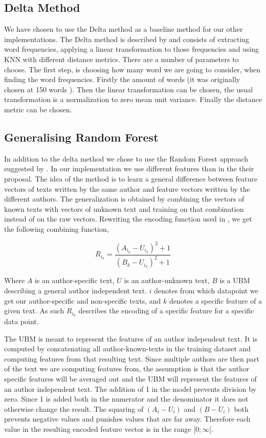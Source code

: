\subsection{Delta Method} \label{subsec:method:delta_method}

We have chosen to use the Delta method as a baseline method for our other
implementations. The Delta method is described by \cite{evert2015towards} and
consists of extracting word frequencies, applying a linear transformation to
those frequencies and using \gls{KNN} with different distance metrics. There are
a number of parameters to choose. The first step, is choosing how many word we
are going to consider, when finding the word frequencies. Firstly the amount of
words (it was originally chosen at 150 words \cite{evert2015towards}). Then the
linear transformation can be chosen, the usual transformation is a normalization
to zero mean unit variance. Finally the distance metric can be chosen.

\subsection{Generalising Random Forest} \label{subsec:method:generalising_random_forest}
In addition to the delta method we chose to use the Random Forest approach
suggested by \cite{pacheco2015}. In our implementation we use different features
than in the their proposal. The idea of the method is to learn a general
difference between feature vectors of texts written by the same author and
feature vectors written by the different authors. The generalization is obtained
by combining the vectors of known texts with vectors of unknown text and
training on that combination instead of on the raw vectors. Rewriting the
encoding function used in \cite{pacheco2015}, we get the following combining
function,

\begin{equation}
    R_{i_k} = \frac{(A_{i_k}-U_{i_k})^2+1}{(B_k-U_{i_k})^2+1}
\end{equation}

Where $A$ is an author-specific text, $U$ is an author-unknown text, $B$ is a
\gls{UBM} describing a general author independent text. $i$ denotes from which
datapoint we get our author-specific and non-specific texts, and $k$ denotes a
specific feature of a given text. As such $R_{i_k}$ describes the encoding of a
specific feature for a specific data point.

The \gls{UBM} is meant to represent the features of an author independent
text. It is computed by concatenating all author-known-texts in the training
dataset and computing features from that resulting text. Since multiple authors
are then part of the text we are computing features from, the assumption is
that the author specific features will be averaged out and the \gls{UBM} will
represent the features of an author independent text. The addition of 1 in the
model prevents division by zero. Since 1 is added both in the numerator and the
denominator it does not otherwise change the result. The squaring of $(A_i -
U_i)$ and $(B - U_i)$ both prevents negative values and punishes values that are
far away. Therefore each value in the resulting encoded feature vector is in the
range $[0; \infty[$.

